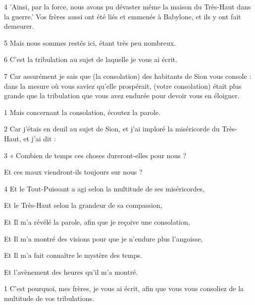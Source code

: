 \par 4 'Ainsi, par la force, nous avons pu dévaster même la maison du Très-Haut dans la guerre.' Vos frères aussi ont été liés et emmenés à Babylone, et ils y ont fait demeurer.

\par 5 Mais nous sommes restés ici, étant très peu nombreux.

\par 6 C'est la tribulation au sujet de laquelle je vous ai écrit.

\par 7 Car assurément je sais que (la consolation) des habitants de Sion vous console : dans la mesure où vous saviez qu'elle prospérait, (votre consolation) était plus grande que la tribulation que vous avez endurée pour devoir vous en éloigner.


\par 1 Mais concernant la consolation, écoutez la parole.

\par 2 Car j'étais en deuil au sujet de Sion, et j'ai imploré la miséricorde du Très-Haut, et j'ai dit :

\par 3 « Combien de temps ces choses dureront-elles pour nous ?

\par Et ces maux viendront-ils toujours sur nous ?

\par 4 Et le Tout-Puissant a agi selon la multitude de ses miséricordes,

\par Et le Très-Haut selon la grandeur de sa compassion,

\par Et Il m'a révélé la parole, afin que je reçoive une consolation,

\par Et Il m'a montré des visions pour que je n'endure plus l'angoisse,

\par Et Il m'a fait connaître le mystère des temps.

\par Et l'avènement des heures qu'il m'a montré.


\par 1 C'est pourquoi, mes frères, je vous ai écrit, afin que vous vous consoliez de la multitude de vos tribulations.


